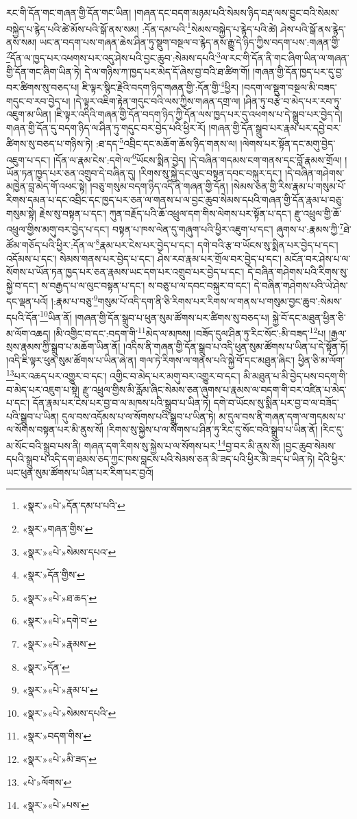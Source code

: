 རང་གི་དོན་གང་གཞན་གྱི་དོན་གང་ཡིན། །གཞན་དང་བདག་མཉམ་པའི་སེམས་ཉིད་བརྡ་ལས་བྱུང་བའི་སེམས་བསྐྱེད་པ་རྙེད་པའི་ཚེ་མོས་པའི་སྒོ་ནས་སམ། :དོན་དམ་པའི་\footnote{«སྣར་»«པེ་»དོན་དམ་པ་པའི་}སེམས་བསྐྱེད་པ་རྙེད་པའི་ཚེ། ཤེས་པའི་སྒོ་ནས་རྙེད་ནས་སམ། ཡང་ན་བདག་པས་གཞན་ཆེས་ཤིན་ཏུ་སྡུག་བསྔལ་བ་རྙེད་ནས་རྒྱུ་དེ་ཉིད་ཀྱིས་བདག་པས་:གཞན་གྱི་\footnote{«སྣར་»གཞན་གྱིས་}དོན་ལ་ཁྱད་པར་འཕགས་པར་འདུ་ཤེས་པའི་བྱང་ཆུབ་:སེམས་དཔའི་\footnote{«སྣར་»«པེ་»སེམས་དཔའ་}ལ་རང་གི་དོན་ནི་གང་ཞིག་ཡིན་ལ་གཞན་གྱི་དོན་གང་ཞིག་ཡིན་ཏེ། དེ་ལ་གཉིས་ཀ་ཁྱད་པར་མེད་དོ་ཞེས་བྱ་བའི་ཐ་ཚིག་གོ། །གཞན་གྱི་དོན་ཁྱད་པར་དུ་བྱ་བར་ཚིགས་སུ་བཅད་པ། ཇི་ལྟར་སྙིང་རྗེའི་བདག་ཉིད་གཞན་གྱི་:དོན་གྱི་\footnote{«སྣར་»དོན་གྱིས་}ཕྱིར། །བདག་ལ་སྡུག་བསྔལ་མི་བཟད་གདུང་བ་རབ་བྱེད་པ། །དེ་ལྟར་འཇིག་རྟེན་གདུང་བའི་ལས་ཀྱིས་གཞན་དགྲ་ལ། །ཤིན་ཏུ་བརྩེ་བ་མེད་པར་རབ་ཏུ་འཇུག་མ་ཡིན། །ཇི་ལྟར་འདིའི་གཞན་གྱི་དོན་བདག་ཉིད་ཀྱི་དོན་ལས་ཁྱད་པར་དུ་འཕགས་པ་དེ་སྒྲུབ་པར་བྱེད་དེ། གཞན་གྱི་དོན་དུ་བདག་ཉིད་ལ་ཤིན་ཏུ་གདུང་བར་བྱེད་པའི་ཕྱིར་རོ། །གཞན་གྱི་དོན་སྒྲུབ་པར་རྣམ་པར་དབྱེ་བར་ཚིགས་སུ་བཅད་པ་གཉིས་ཏེ། :ཐ་དད་\footnote{«སྣར་»«པེ་»ཐ་ཆད་}འབྲིང་དང་མཆོག་ཆོས་ཉིད་གནས་ལ། །ལེགས་པར་སྟོན་དང་མགུ་བྱེད་འཇུག་པ་དང་། །དོན་ལ་རྣམ་ངེས་:དགེ་ལ་\footnote{«སྣར་»«པེ་»དགེ་བ་}ཡོངས་སྨིན་བྱེད། །དེ་བཞིན་གདམས་ངག་གནས་དང་བློ་རྣམས་གྲོལ། །ཡོན་ཏན་ཁྱད་པར་ཅན་འགྲུབ་དེ་བཞིན་དུ། །རིགས་སུ་སྐྱེ་དང་ལུང་བསྟན་དབང་བསྐུར་དང་། །དེ་བཞིན་གཤེགས་མཁྱེན་བླ་མེད་གོ་འཕང་སྟེ། །བཅུ་གསུམ་བདག་ཉིད་འདི་ནི་གཞན་གྱི་དོན། །སེམས་ཅན་གྱི་རིས་རྣམ་པ་གསུམ་པོ་རིགས་དམན་པ་དང་འབྲིང་དང་ཁྱད་པར་ཅན་ལ་གནས་པ་ལ་བྱང་ཆུབ་སེམས་དཔའི་གཞན་གྱི་དོན་རྣམ་པ་བཅུ་གསུམ་སྟེ། རྗེས་སུ་བསྟན་པ་དང་། ཀུན་བརྗོད་པའི་ཆོ་འཕྲུལ་དག་གིས་ལེགས་པར་སྟོན་པ་དང་། རྫུ་འཕྲུལ་གྱི་ཆོ་འཕྲུལ་གྱིས་མགུ་བར་བྱེད་པ་དང་། བསྟན་པ་ཁས་ལེན་དུ་གཞུག་པའི་ཕྱིར་འཇུག་པ་དང་། ཞུགས་པ་:རྣམས་ཀྱི་\footnote{«སྣར་»«པེ་»རྣམས་}ཐེ་ཚོམ་གཅོད་པའི་ཕྱིར་:དོན་ལ་\footnote{«སྣར་»དོན་}རྣམ་པར་ངེས་པར་བྱེད་པ་དང་། དགེ་བའི་རྩ་བ་ཡོངས་སུ་སྨིན་པར་བྱེད་པ་དང་། འདོམས་པ་དང་། སེམས་གནས་པར་བྱེད་པ་དང་། ཤེས་རབ་རྣམ་པར་གྲོལ་བར་བྱེད་པ་དང་། མངོན་བར་ཤེས་པ་ལ་སོགས་པ་ཡོན་ཏན་ཁྱད་པར་ཅན་རྣམས་ཡང་དག་པར་འགྲུབ་པར་བྱེད་པ་དང་། དེ་བཞིན་གཤེགས་པའི་རིགས་སུ་སྐྱེ་བ་དང་། ས་བརྒྱད་པ་ལ་ལུང་བསྟན་པ་དང་། ས་བཅུ་པ་ལ་དབང་བསྐུར་བ་དང་། དེ་བཞིན་གཤེགས་པའི་ཡེ་ཤེས་དང་ལྡན་པའོ། །:རྣམ་པ་བཅུ་\footnote{«སྣར་»«པེ་»རྣམ་པ་}གསུམ་པོ་འདི་དག་ནི་ཅི་རིགས་པར་རིགས་ལ་གནས་པ་གསུམ་བྱང་ཆུབ་:སེམས་དཔའི་དོན་\footnote{«སྣར་»«པེ་»སེམས་དཔའི་}ཡིན་ནོ། །གཞན་གྱི་དོན་སྒྲུབ་པ་ཕུན་སུམ་ཚོགས་པར་ཚིགས་སུ་བཅད་པ། སྐྱེ་བོ་དང་མཐུན་ཕྱིན་ཅི་མ་ལོག་འཆད། །མི་འགྱིང་བ་དང་:བདག་གི་\footnote{«སྣར་»བདག་གིས་}མེད་ལ་མཁས། །བཟོད་དུལ་ཤིན་ཏུ་རིང་སོང་:མི་བཟད་\footnote{«སྣར་»«པེ་»མི་ཟད་}པ། །རྒྱལ་སྲས་རྣམས་ཀྱི་སྒྲུབ་པ་མཆོག་ཡིན་ནོ། །འདིས་ནི་གཞན་གྱི་དོན་སྒྲུབ་པ་འདི་ཕུན་སུམ་ཚོགས་པ་ཡིན་པ་དེ་སྟོན་ཏོ། །འདི་ཇི་ལྟར་ཕུན་སུམ་ཚོགས་པ་ཡིན་ཞེ་ན། གལ་ཏེ་རིགས་ལ་གནས་པའི་སྐྱེ་བོ་དང་མཐུན་ཞིང་། ཕྱིན་ཅི་མ་ལོག་\footnote{«པེ་»ལོགས་}པར་འཆད་པར་འགྱུར་བ་དང་། འགྱིང་བ་མེད་པར་མགུ་བར་འགྱུར་བ་དང་། མི་མཐུན་པ་མི་བྱེད་པས་བདག་གི་བ་མེད་པར་འཇུག་པ་སྟེ། རྫུ་འཕྲུལ་གྱིས་མི་རློམ་ཞིང་སེམས་ཅན་ཞུགས་པ་རྣམས་ལ་བདག་གི་བར་འཛིན་པ་མེད་པ་དང་། དོན་རྣམ་པར་ངེས་པར་བྱ་བ་ལ་མཁས་པའི་སྒྲུབ་པ་ཡིན་ཏེ། དགེ་བ་ཡོངས་སུ་སྨིན་པར་བྱ་བ་ལ་བཟོད་པའི་སྒྲུབ་པ་ཡིན། དུལ་བས་འདོམས་པ་ལ་སོགས་པའི་སྒྲུབ་པ་ཡིན་ཏེ། མ་དུལ་བས་ནི་གཞན་དག་ལ་གདམས་པ་ལ་སོགས་བསྟན་པར་མི་ནུས་སོ། །རིགས་སུ་སྐྱེས་པ་ལ་སོགས་པ་ཤིན་ཏུ་རིང་དུ་སོང་བའི་སྒྲུབ་པ་ཡིན་ནོ། །རིང་དུ་མ་སོང་བའི་སྒྲུབ་པས་ནི། གཞན་དག་རིགས་སུ་སྐྱེས་པ་ལ་སོགས་པར་\footnote{«སྣར་»«པེ་»པས་}བྱ་བར་མི་ནུས་སོ། །བྱང་ཆུབ་སེམས་དཔའི་སྒྲུབ་པ་འདི་དག་ཐམས་ཅད་ཀྱང་ཁས་བླངས་པའི་སེམས་ཅན་མི་ཟད་པའི་ཕྱིར་མི་ཟད་པ་ཡིན་ཏེ། དེའི་ཕྱིར་ཡང་ཕུན་སུམ་ཚོགས་པ་ཡིན་པར་རིག་པར་བྱའོ། 